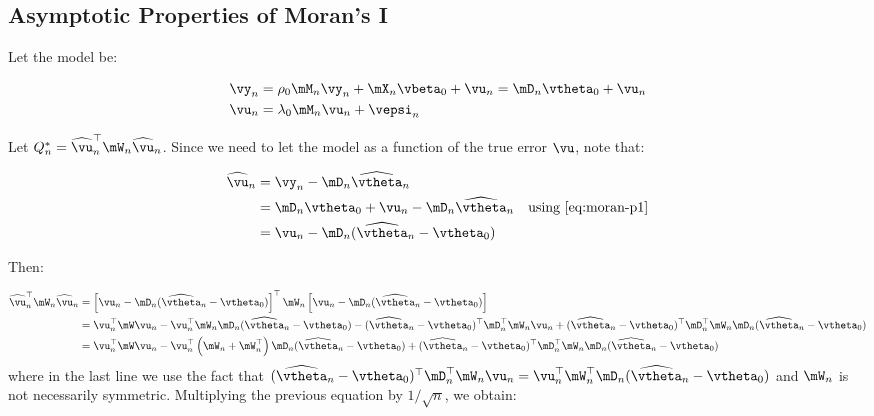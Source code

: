 \documentclass[english,12pt]{book}\usepackage[]{graphicx}\usepackage[]{xcolor}
\begin{document}
\begin{subappendices}

\section{Asymptotic Properties of Moran's I}


Let the model be:

\begin{equation}\label{eq:moran-p1}
\begin{aligned}
  \vy_n &= \rho_0\mM_n\vy_n + \mX_n\vbeta_0 + \vu_n  =  \mD_n\vtheta_0 + \vu_n \\
  \vu_n &= \lambda_0\mM_n\vu_n + \vepsi_n
\end{aligned}
\end{equation}

Let $Q_n^* = \widehat{\vu}_n^\top\mW_n\widehat{\vu}_n$. Since we need to let the model as a function of the true error $\vu$, note that:

\begin{equation}\label{eq:moran-p2}
\begin{aligned}
\widehat{\vu}_n & = \vy_n - \mD_n\widehat{\vtheta}_n \\
& = \mD_n\vtheta_0 + \vu_n -\mD_n\widehat{\vtheta}_n\quad\mbox{using \eqref{eq:moran-p1}} \\
&= \vu_n - \mD_n(\widehat{\vtheta}_n - \vtheta_0)
\end{aligned}
\end{equation}

Then:

\begin{equation*}
\begin{aligned}
  \widehat{\vu}_n^\top\mW_n\widehat{\vu}_n & = \left[\vu_n - \mD_n(\widehat{\vtheta}_n - \vtheta_0)\right]^\top\mW_n\left[\vu_n - \mD_n(\widehat{\vtheta}_n - \vtheta_0)\right] \\
  & = \vu_n^\top\mW\vu_n - \vu_n^\top\mW_n\mD_n(\widehat{\vtheta}_n - \vtheta_0)-(\widehat{\vtheta}_n - \vtheta_0)^\top\mD_n^\top\mW_n\vu_n +(\widehat{\vtheta}_n - \vtheta_0)^\top\mD_n^\top\mW_n\mD_n(\widehat{\vtheta}_n - \vtheta_0)\\
  & = \vu_n^\top\mW\vu_n - \vu_n^\top\left(\mW_n + \mW_n^\top\right)\mD_n(\widehat{\vtheta}_n - \vtheta_0)+(\widehat{\vtheta}_n - \vtheta_0)^\top\mD_n^\top\mW_n\mD_n(\widehat{\vtheta}_n - \vtheta_0)
\end{aligned}
\end{equation*}
%
where in the last line we use the fact that $(\widehat{\vtheta}_n - \vtheta_0)^\top\mD_n^\top\mW_n\vu_n=\vu_n^\top\mW_n^\top\mD_n(\widehat{\vtheta}_n - \vtheta_0)$ and $\mW_n$ is not necessarily symmetric. Multiplying the previous equation by $1/\sqrt{n}$, we obtain:


\end{subappendices}
\end{document}
